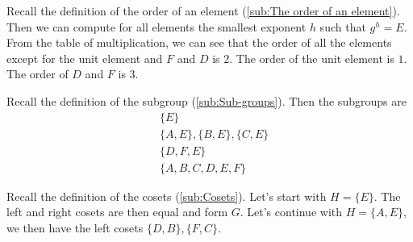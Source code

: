 Recall the definition of the order of an element
(\autoref{sub:The order of an element}).
Then we can compute for all elements the smallest exponent $h$ such that $g^h=E$.
From the table of multiplication, we can see that the order of all the elements
except for the unit element and $F$ and $D$ is $2$. The order of the unit
element is $1$. The order of $D$ and $F$ is $3$.

Recall the definition of the subgroup (\autoref{sub:Sub-groups}). Then the
subgroups are
\begin{align*}
    &\{E\}\\
    &\{A,E\},\{B,E\},\{C,E\}\\
    &\{D,F,E\}\\
    &\{A,B,C,D,E,F\}
\end{align*}

Recall the definition of the cosets (\autoref{sub:Cosets}). Let's start with
$H=\{E\}$. The left and right cosets are then equal and form $G$. Let's continue
with $H=\{A,E\}$, we then have the left cosets $\{D,B\}, \{F,C\}$.

